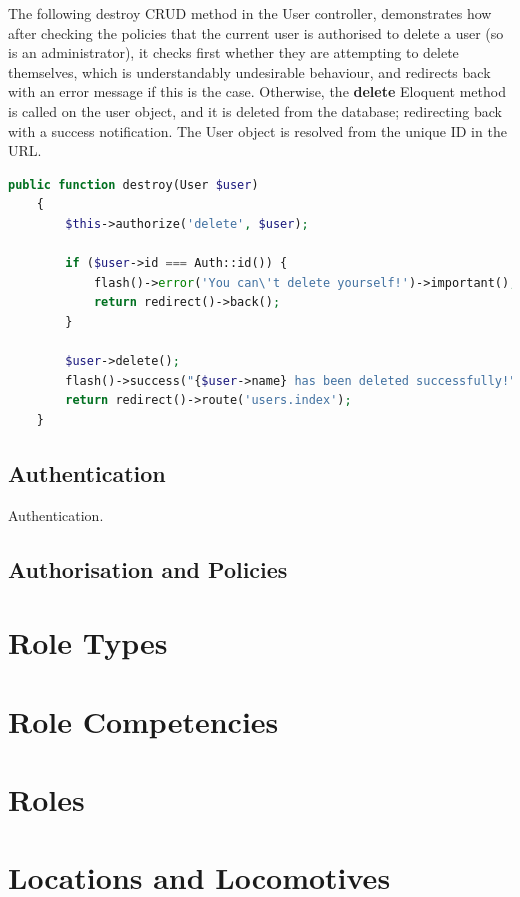 The following destroy CRUD method in the User controller, demonstrates how after checking the policies that the current user is authorised to delete a user (so is an administrator), it checks first whether they are attempting to delete themselves, which is understandably undesirable behaviour, and redirects back with an error message if this is the case. Otherwise, the \textbf{delete} Eloquent method is called on the user object, and it is deleted from the database; redirecting back with a success notification. The User object is resolved from the unique ID in the URL. \cite{Laravel7}

\begin{lstlisting}[language=PHP, breaklines]
    public function destroy(User $user)
    {
        $this->authorize('delete', $user);

        if ($user->id === Auth::id()) {
            flash()->error('You can\'t delete yourself!')->important();
            return redirect()->back();
        }

        $user->delete();
        flash()->success("{$user->name} has been deleted successfully!")->important();
        return redirect()->route('users.index');
    }
\end{lstlisting}

\subsection{Authentication}
Authentication.

\subsection{Authorisation and Policies}

\section{Role Types}

\section{Role Competencies}

\section{Roles}

\section{Locations and Locomotives}

